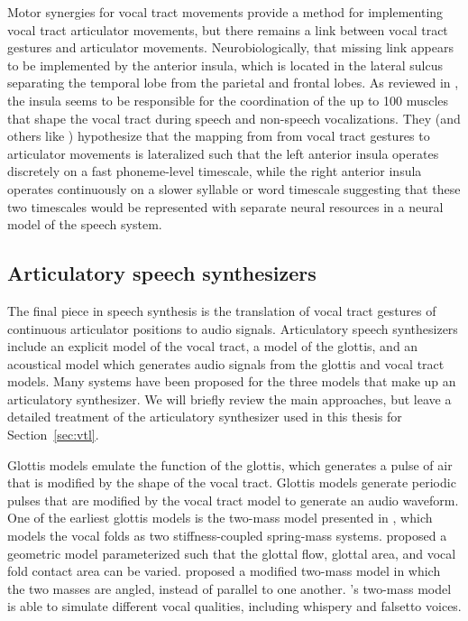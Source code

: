 
Motor synergies for vocal tract movements
provide a method for implementing
vocal tract articulator movements,
but there remains a link
between vocal tract gestures
and articulator movements.
Neurobiologically,
that missing link appears to be
implemented by the anterior insula,
which is located in the lateral sulcus
separating the temporal lobe from
the parietal and frontal lobes.
As reviewed in \citet{ackermann2004},
the insula seems to be responsible
for the coordination of the up to 100 muscles
that shape the vocal tract during speech
and non-speech vocalizations.
They (and others like \citealt{ivry1998})
hypothesize that the mapping from
from vocal tract gestures to articulator movements
is lateralized such that
the left anterior insula operates
discretely on a fast phoneme-level timescale,
while the right anterior insula
operates continuously on a slower
syllable or word timescale
suggesting that these two timescales
would be represented
with separate neural resources
in a neural model of the speech system.

\subsection{Articulatory speech synthesizers}

The final piece in speech synthesis
is the translation of vocal tract gestures
of continuous articulator positions
to audio signals.
Articulatory speech synthesizers
include an explicit model
of the vocal tract,
a model of the glottis,
and an acoustical model
which generates audio signals
from the glottis and vocal tract models.
Many systems have been proposed
for the three models that make up
an articulatory synthesizer.
We will briefly review
the main approaches,
but leave a detailed treatment
of the articulatory synthesizer
used in this thesis
for Section~\ref{sec:vtl}.

Glottis models emulate the function
of the glottis,
which generates a pulse of air
that is modified by the shape
of the vocal tract.
Glottis models generate periodic pulses
that are modified by the vocal tract model
to generate an audio waveform.
One of the earliest glottis models
is the two-mass model
presented in \citet{ishizaka1972},
which models the vocal folds
as two stiffness-coupled
spring-mass systems.
\citet{titze1989}
proposed a geometric model
parameterized such that
the glottal flow,
glottal area, and vocal fold
contact area can be varied.
\citet{birkholz2011}
proposed a modified two-mass model
in which the two masses
are angled, instead of parallel
to one another.
\citeauthor{birkholz2011}'s two-mass model
is able to simulate
different vocal qualities,
including whispery and falsetto voices.

